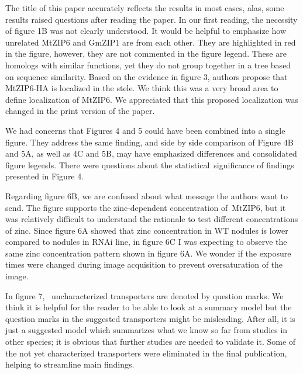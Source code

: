 \documentclass[10pt]{article}
\begin{document}
The title of this paper accurately reflects the results in most cases,
alas, some results raised questions after reading the paper. In our
first reading, the necessity of figure 1B was not clearly understood. It
would be helpful to emphasize how unrelated MtZIP6 and GmZIP1 are from
each other. They are highlighted in red in the figure, however, they are
not commented in the figure legend. These are homologs with similar
functions, yet they do not group together in a tree based on sequence
similarity. Based on the evidence in figure 3, authors propose that
MtZIP6-HA is localized in the stele. We think this was a very broad area
to define localization of MtZIP6. We appreciated that this proposed
localization was changed in the print version of the paper.~

\par\null

We had concerns that Figures 4 and 5 could have been combined into a
single figure. They address the same finding, and side by side
comparison of Figure 4B and 5A, as well as 4C and 5B, may have
emphasized differences and consolidated figure legends. There were
questions about the statistical~significance of findings presented in
Figure 4.

Regarding figure 6B, we are confused about what message the authors want
to send. The figure supports the zinc-dependent concentration of~MtZIP6,
but it was relatively difficult to understand the rationale to test
different concentrations of zinc. Since figure 6A showed that zinc
concentration in WT nodules is lower compared to nodules in RNAi line,
in figure 6C I was expecting to observe the same zinc concentration
pattern shown in figure 6A. We wonder if the exposure times were changed
during image acquisition to prevent oversaturation of the image.

\par\null

In figure 7,~ uncharacterized transporters are denoted by question
marks. We think it is helpful for the reader to be able to look at a
summary model but the question marks in the suggested transporters might
be misleading. After all, it is just a suggested model which summarizes
what we know so far from studies in other species; it is obvious that
further studies are needed to validate it. Some of the not yet
characterized transporters were eliminated in the final publication,
helping to streamline main findings.~~

\FloatBarrier
\end{document}
